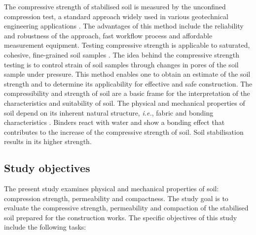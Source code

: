 \documentclass{amestyle}
\begin{document}
The compressive strength of stabilised soil is measured by the unconfined compression test, a standard approach widely used in various geotechnical engineering applications \cite{SHIBI20211123,KARDANI2021100591}. The advantages of this method include the reliability and robustness of the approach, fast workflow process and affordable measurement equipment. Testing compressive strength is applicable to saturated, cohesive, fine-grained soil samples \cite{MOUSAVI2021104890,AHMED201527}. The idea behind the compressive strength testing is to control strain of soil samples through changes in pores of the soil sample under pressure. This method enables one to obtain an estimate of the soil strength and to determine its applicability for effective and safe construction. The compressibility and strength of soil are a basic frame for the interpretation of the characteristics and suitability of soil. The physical and mechanical properties of soil depend on its inherent natural structure, \emph{i.e.}, fabric and bonding characteristics \cite{Burland}. Binders react with water and show a bonding effect that contributes to the increase of the compressive strength of soil. Soil stabilisation results in its higher strength.

\subsection{Study objectives} 
The present study examines physical and mechanical properties of soil: compression strength, permeability and compactness. The study goal is to evaluate the compressive strength, permeability and compaction of the stabilised soil prepared for the construction works. The specific objectives of this study include the following tasks:
\end{document}
